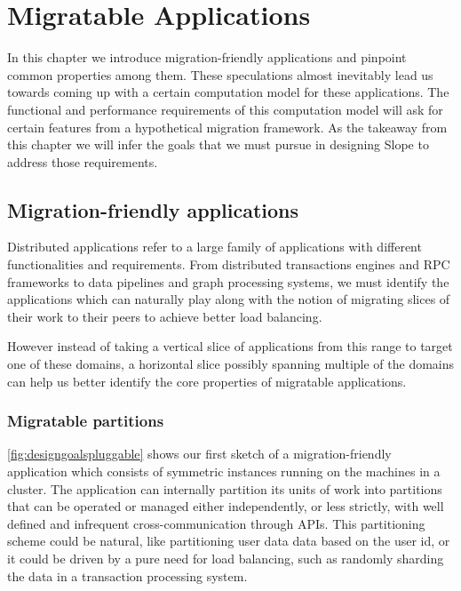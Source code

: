 \chapter{Migratable Applications}
\label{chap:migratableapps}

In this chapter we introduce migration-friendly applications and pinpoint
common properties among them. These speculations almost inevitably lead
us towards coming up with a certain computation model for these
applications.
The functional and performance requirements of this computation model will
ask for certain features from a hypothetical migration framework. As the
takeaway from this chapter we will infer the goals that we must pursue
in designing Slope to address those requirements.
%
%
%
%


\section{Migration-friendly applications}
Distributed applications refer to a large family of applications with
different functionalities and requirements. From distributed transactions
engines and RPC frameworks to data pipelines and graph processing systems,
we must identify the
applications which can naturally play along with the notion of migrating
slices of their work to their peers to achieve better load balancing.

However instead of taking a vertical slice of applications from this range
to target one of these domains, a horizontal slice possibly spanning
multiple of the domains can help us better identify the core
properties of migratable applications.

\subsection{Migratable partitions}

\autoref{fig:designgoalspluggable} shows our first sketch of a
migration-friendly application which consists of symmetric instances
running on the machines in a cluster. The application can internally
partition its units of work into partitions that can be operated or
managed either independently, or less strictly,
with well defined and infrequent cross-communication through APIs.
This partitioning scheme could be natural, like
partitioning user data data based on the user id, or it could be driven
by a pure need for load balancing, such as randomly sharding the data
in a transaction processing system.



